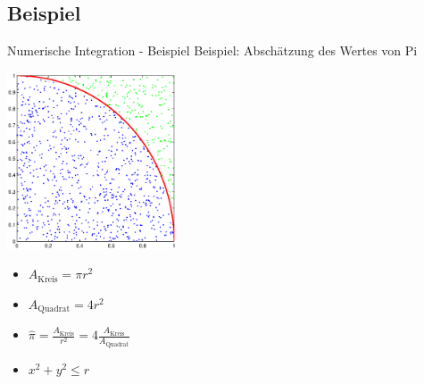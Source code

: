 \documentclass{beamer}
\begin{document}
\subsection{Beispiel}
\begin{frame}{Numerische Integration - Beispiel}
	Beispiel: Abschätzung des Wertes von Pi
	\begin{minipage}{5cm}
		\includegraphics[width=5cm]{images/kreis_hitmiss.eps}
	\end{minipage}
	\begin{minipage}{5cm}
		\begin{itemize}
		\item<1-> $A_{\text{Kreis}} = \pi r^{2}$
		\item<1-> $A_{\text{Quadrat}} = 4r^2$
		\item<1-> $\hat{\pi} = \frac{A_{\text{Kreis}}}{r^2} = 4 \frac{A_{\text{Kreis}}}{A_{\text{Quadrat}}}$
		\item<1-> $x^2 + y^2 \leq r$
		\end{itemize}
	\end{minipage}
\end{frame}
\end{document}

